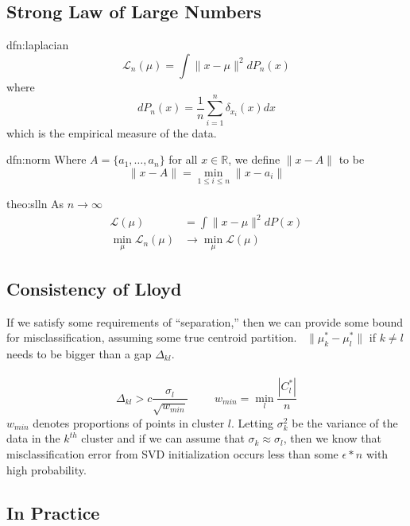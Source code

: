 \documentclass[12pt]{article}
\theoremstyle{plain}
\begin{document}
\subsection{Strong Law of Large Numbers}
\label{subsec:slln}
\begin{dfn}[Laplacian]{dfn:laplacian}
	\[
	\mathcal{L}_n (\mu) = \int \| x - \mu \|^2 d P_n(x)
	\]
	where
	\[
	d P_n (x) = \frac{1}{n} \sum_{i = 1}^n \delta_{x_i} (x) dx
	\]
	which is the empirical measure of the data.
\end{dfn}
\begin{dfn}{dfn:norm}
	Where $ A = \{ a_1, \ldots, a_n \} $ for all $ x \in \mathbb{R} $, we define $ \| x - A \| $ to be
	\[
	\| x - A \| = \min_{1 \leq i \leq n} \| x - a_i \|
	\]
\end{dfn}
\begin{theo}{theo:slln}
	As $ n \to \infty $
	\begin{align*}
		\mathcal{L} (\mu) &= \int \| x - \mu \|^2 dP(x) \\
		\min_{\mu} \mathcal{L}_n (\mu) &\to \min_{\mu} \mathcal{L} (\mu)
	\end{align*}
\end{theo}

\subsection{Consistency of Lloyd}
\label{subsec:consistency}
If we satisfy some requirements of ``separation,'' then we can provide some bound for misclassification, assuming some true centroid partition.~\cite{kumar-2010}
$ \| \mu^{*}_{k} - \mu^{*}_{l} \| $ if $ k \neq l $ needs to be bigger than a gap $ \Delta_{kl} $.
\\ \\
\[
\Delta_{kl} > c \frac{\sigma_l}{\sqrt{w_{min}}} \hspace{1cm} w_{min} = \min_{l} \frac{|C_l^{*}|}{n}
\]
$w_{min}$ denotes proportions of points in cluster $l$. Letting $ \sigma_k^2 $ be the variance of the data in the $ k^{th} $ cluster and if we can assume that $ \sigma_k \approx \sigma_l $, then we know that misclassification error from SVD initialization occurs less than some $ \epsilon * n $ with high probability.

\subsection{In Practice}
\label{subsec:inpractice}
\end{document}
